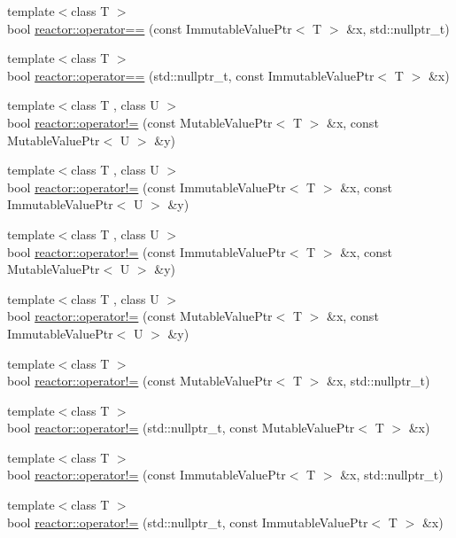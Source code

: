 \begin{DoxyCompactItemize}
\item 
{\footnotesize template$<$class T $>$ }\\bool \hyperlink{namespacereactor_ab3fb80a815368302fcd1985b0fee5a6c}{reactor\+::operator==} (const Immutable\+Value\+Ptr$<$ T $>$ \&x, std\+::nullptr\+\_\+t)
\item 
{\footnotesize template$<$class T $>$ }\\bool \hyperlink{namespacereactor_a59010e2c0f2dd0420fb59abab0a20e10}{reactor\+::operator==} (std\+::nullptr\+\_\+t, const Immutable\+Value\+Ptr$<$ T $>$ \&x)
\item 
{\footnotesize template$<$class T , class U $>$ }\\bool \hyperlink{namespacereactor_a73f7e0bf8b9c8adf7cac8ecc521de7c7}{reactor\+::operator!=} (const Mutable\+Value\+Ptr$<$ T $>$ \&x, const Mutable\+Value\+Ptr$<$ U $>$ \&y)
\item 
{\footnotesize template$<$class T , class U $>$ }\\bool \hyperlink{namespacereactor_a79f6e5da337bd260b36b8e702160f1e6}{reactor\+::operator!=} (const Immutable\+Value\+Ptr$<$ T $>$ \&x, const Immutable\+Value\+Ptr$<$ U $>$ \&y)
\item 
{\footnotesize template$<$class T , class U $>$ }\\bool \hyperlink{namespacereactor_a247d25ed08296b3afc70c88f7f2e3b5e}{reactor\+::operator!=} (const Immutable\+Value\+Ptr$<$ T $>$ \&x, const Mutable\+Value\+Ptr$<$ U $>$ \&y)
\item 
{\footnotesize template$<$class T , class U $>$ }\\bool \hyperlink{namespacereactor_a71b00843b7797d6a9d52c3e0b85a06a7}{reactor\+::operator!=} (const Mutable\+Value\+Ptr$<$ T $>$ \&x, const Immutable\+Value\+Ptr$<$ U $>$ \&y)
\item 
{\footnotesize template$<$class T $>$ }\\bool \hyperlink{namespacereactor_aeef65c8dea31e1e64d5488fbd5be4f5f}{reactor\+::operator!=} (const Mutable\+Value\+Ptr$<$ T $>$ \&x, std\+::nullptr\+\_\+t)
\item 
{\footnotesize template$<$class T $>$ }\\bool \hyperlink{namespacereactor_a43398d2b182f1f579ce7d26b88c8ca97}{reactor\+::operator!=} (std\+::nullptr\+\_\+t, const Mutable\+Value\+Ptr$<$ T $>$ \&x)
\item 
{\footnotesize template$<$class T $>$ }\\bool \hyperlink{namespacereactor_ace39af7a63437facb0d3a59aa87e59b8}{reactor\+::operator!=} (const Immutable\+Value\+Ptr$<$ T $>$ \&x, std\+::nullptr\+\_\+t)
\item 
{\footnotesize template$<$class T $>$ }\\bool \hyperlink{namespacereactor_a84d02734e8877c36a53e02a6228348bf}{reactor\+::operator!=} (std\+::nullptr\+\_\+t, const Immutable\+Value\+Ptr$<$ T $>$ \&x)
\end{DoxyCompactItemize}
